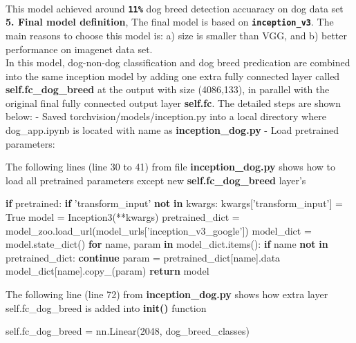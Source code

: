 \documentclass[11pt]{article}
\newenvironment{Shaded}{}{}
\newcommand{\KeywordTok}[1]{\textcolor[rgb]{0.00,0.44,0.13}{\textbf{{#1}}}}
\newcommand{\DecValTok}[1]{\textcolor[rgb]{0.25,0.63,0.44}{{#1}}}
\newcommand{\StringTok}[1]{\textcolor[rgb]{0.25,0.44,0.63}{{#1}}}
\newcommand{\NormalTok}[1]{{#1}}
\newcommand{\VariableTok}[1]{\textcolor[rgb]{0.10,0.09,0.49}{{#1}}}
\newcommand{\ControlFlowTok}[1]{\textcolor[rgb]{0.00,0.44,0.13}{\textbf{{#1}}}}
\newcommand{\OperatorTok}[1]{\textcolor[rgb]{0.40,0.40,0.40}{{#1}}}
\begin{document}
\\
This model achieved around \textbf{\texttt{11\%}} dog breed detection
accuaracy on dog data set \textbf{5. Final model definition}, The final
model is based on \textbf{\texttt{inception\_v3}}. The main reasons to
choose this model is: a) size is smaller than VGG, and b) better
performance on imagenet data set.\\
In this model, dog-non-dog classification and dog breed predication are
combined into the same inception model by adding one extra fully
connected layer called \textbf{self.fc\_dog\_breed} at the output with
size (4086,133), in parallel with the original final fully connected
output layer \textbf{self.fc}. The detailed steps are shown below: -
Saved torchvision/models/inception.py into a local directory where
dog\_app.ipynb is located with name as \textbf{inception\_dog.py} - Load
pretrained parameters:

The following lines (line 30 to 41) from file \textbf{inception\_dog.py}
shows how to load all pretrained parameters except new
\textbf{self.fc\_dog\_breed} layer's

\begin{Shaded}
\begin{Highlighting}[]
\ControlFlowTok{if}\NormalTok{ pretrained:}
    \ControlFlowTok{if} \StringTok{'transform_input'} \KeywordTok{not} \KeywordTok{in}\NormalTok{ kwargs:}
\NormalTok{        kwargs[}\StringTok{'transform_input'}\NormalTok{] }\OperatorTok{=} \VariableTok{True}
\NormalTok{    model }\OperatorTok{=}\NormalTok{ Inception3(}\OperatorTok{**}\NormalTok{kwargs)}
\NormalTok{    pretrained_dict }\OperatorTok{=}\NormalTok{ model_zoo.load_url(model_urls[}\StringTok{'inception_v3_google'}\NormalTok{])}
\NormalTok{    model_dict }\OperatorTok{=}\NormalTok{ model.state_dict()}
    \ControlFlowTok{for}\NormalTok{ name, param }\KeywordTok{in}\NormalTok{ model_dict.items():}
        \ControlFlowTok{if}\NormalTok{ name }\KeywordTok{not} \KeywordTok{in}\NormalTok{ pretrained_dict:}
            \ControlFlowTok{continue}
\NormalTok{        param }\OperatorTok{=}\NormalTok{ pretrained_dict[name].data}
\NormalTok{        model_dict[name].copy_(param)}
    \ControlFlowTok{return}\NormalTok{ model}
\end{Highlighting}
\end{Shaded}

The following line (line 72) from \textbf{inception\_dog.py} shows how
extra layer self.fc\_dog\_breed is added into \textbf{init()} function

\begin{Shaded}
\begin{Highlighting}[]
\VariableTok{self}\NormalTok{.fc_dog_breed }\OperatorTok{=}\NormalTok{ nn.Linear(}\DecValTok{2048}\NormalTok{, dog_breed_classes)}
\end{Highlighting}
\end{Shaded}
\end{document}
